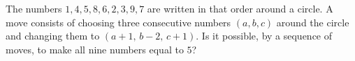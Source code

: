 The numbers $1,4,5,8,6,2,3,9,7$ are written in that order around a circle. A move consists of choosing three consecutive numbers $(a,b,c)$ around the circle and changing them to $(a+1,\,b-2,\,c+1)$. Is it possible, by a sequence of moves, to make all nine numbers equal to $5$?
